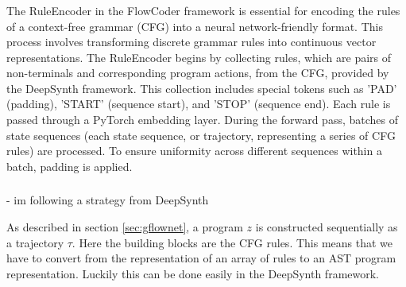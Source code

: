 \subsubsection{}\label{sec:ruleencoder}
The RuleEncoder in the FlowCoder framework is essential for encoding the rules of a context-free grammar (CFG) into a neural network-friendly format. This process involves transforming discrete grammar rules into continuous vector representations.
The RuleEncoder begins by collecting rules, which are pairs of non-terminals and corresponding program actions, from the CFG, provided by the DeepSynth framework. This collection includes special tokens such as 'PAD' (padding), 'START' (sequence start), and 'STOP' (sequence end). Each rule is passed through a PyTorch embedding layer.
During the forward pass, batches of state sequences (each state sequence, or trajectory, representing a series of CFG rules) are processed.
To ensure uniformity across different sequences within a batch, padding is applied.








\subsubsection{}
- im following a strategy from DeepSynth

As described in section \ref{sec:gflownet}, a program $z$ is constructed sequentially as a trajectory $\tau$. Here the building blocks are the CFG rules. This means that we have to convert from the representation of an array of rules to an AST program representation. Luckily this can be done easily in the DeepSynth framework.

